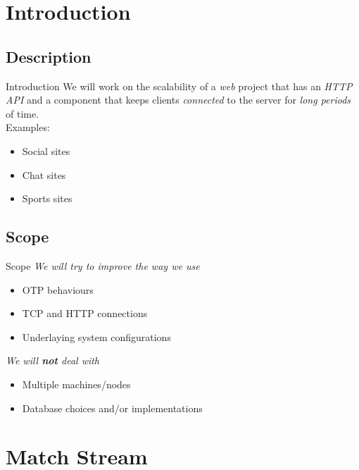 \documentclass[utf8]{beamer}
\begin{document}
\section{Introduction}
\subsection{Description}
\begin{frame}{Introduction}
	We will work on the scalability of a \emph{web} project \pause that has an \emph{HTTP API} \pause and a component that keeps clients \emph{connected} to the server \pause for \emph{long periods} of time.\\
\pause Examples:
	\begin{itemize}
		\item<+-> Social sites
		\item<+-> Chat sites
		\item<+-> Sports sites
	\end{itemize}
\end{frame}

\subsection{Scope}
\begin{frame}{Scope}
	\emph{We will try to improve the way we use}
	\begin{itemize}
		\item OTP behaviours
		\item TCP and HTTP connections
		\item Underlaying system configurations
	\end{itemize}
	\pause
	\emph{We will \textbf{not} deal with}
	\begin{itemize}
		\item Multiple machines/nodes
		\item Database choices and/or implementations
	\end{itemize}
\end{frame}

\section{Match Stream}
\end{document}
